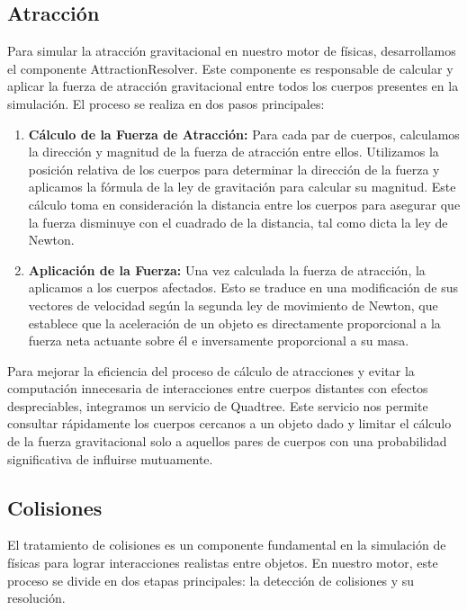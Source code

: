 \subsection{Atracción}
Para simular la atracción gravitacional en nuestro motor de físicas, desarrollamos el componente AttractionResolver. Este componente es responsable de calcular y aplicar la fuerza de atracción gravitacional entre todos los cuerpos presentes en la simulación. El proceso se realiza en dos pasos principales:
\begin{enumerate}
    \item \textbf{Cálculo de la Fuerza de Atracción:} Para cada par de cuerpos, calculamos la dirección y magnitud de la fuerza de atracción entre ellos. Utilizamos la posición relativa de los cuerpos para determinar la dirección de la fuerza y aplicamos la fórmula de la ley de gravitación para calcular su magnitud. Este cálculo toma en consideración la distancia entre los cuerpos para asegurar que la fuerza disminuye con el cuadrado de la distancia, tal como dicta la ley de Newton.
    \item \textbf{Aplicación de la Fuerza:} Una vez calculada la fuerza de atracción, la aplicamos a los cuerpos afectados. Esto se traduce en una modificación de sus vectores de velocidad según la segunda ley de movimiento de Newton, que establece que la aceleración de un objeto es directamente proporcional a la fuerza neta actuante sobre él e inversamente proporcional a su masa.
\end{enumerate}
Para mejorar la eficiencia del proceso de cálculo de atracciones y evitar la computación innecesaria de interacciones entre cuerpos distantes con efectos despreciables, integramos un servicio de Quadtree. Este servicio nos permite consultar rápidamente los cuerpos cercanos a un objeto dado y limitar el cálculo de la fuerza gravitacional solo a aquellos pares de cuerpos con una probabilidad significativa de influirse mutuamente.

\subsection{Colisiones}
El tratamiento de colisiones es un componente fundamental en la simulación de físicas para lograr interacciones realistas entre objetos. En nuestro motor, este proceso se divide en dos etapas principales: la detección de colisiones y su resolución.
